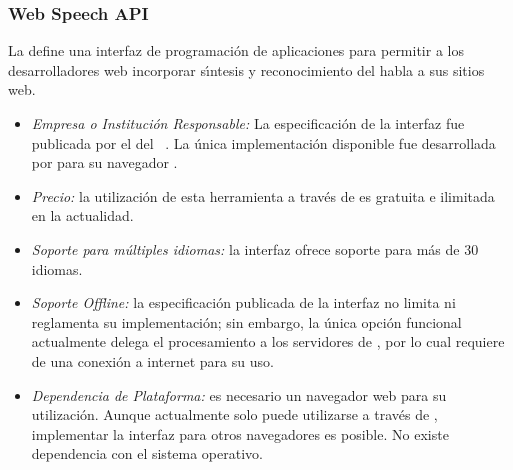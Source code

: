 \subsubsection{Web Speech API}
\label{sec:webspeech}

La  define una interfaz de programaci\'on de aplicaciones para permitir
a los desarrolladores web incorporar s{\'\i}ntesis y reconocimiento del habla a sus sitios web.

\begin{itemize}
	\item \emph{Empresa o Instituci\'on Responsable:} La especificaci\'on de la interfaz fue
	publicada por el  del
	\mbox{ \cite{GoogleWebSpeechAPI}.}
	La \'unica implementaci\'on disponible fue desarrollada por  para su navegador .
	\item \emph{Precio:} la utilizaci\'on de esta herramienta a trav\'es de  es gratuita e
	ilimitada en la actualidad.
	\item \emph{Soporte para m\'ultiples idiomas:} la interfaz ofrece soporte para m\'as de 30 idiomas.
	\item \emph{Soporte Offline:} la especificaci\'on publicada de la interfaz no limita ni reglamenta su
	implementaci\'on; sin embargo, la \'unica opci\'on funcional actualmente delega el procesamiento a los
	servidores de , por lo cual requiere de una conexi\'on a internet para su uso.
	\item \emph{Dependencia de Plataforma:} es necesario un navegador web para su utilización.
	Aunque actualmente solo puede utilizarse a trav\'es de , implementar la interfaz
	para otros navegadores es posible. No existe dependencia con el sistema operativo.
\end{itemize}


